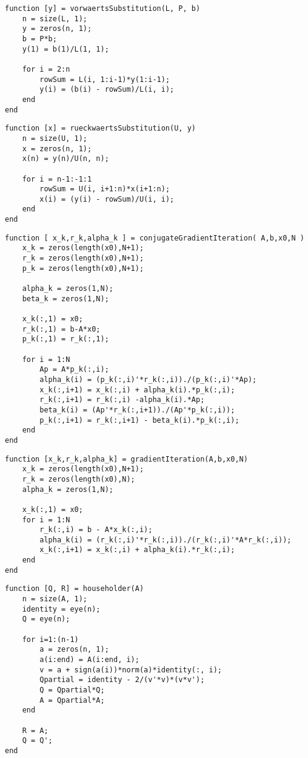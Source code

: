 \documentclass[german]{latex4ei/latex4ei_sheet}
\begin{document}
\begin{lstlisting}
function [y] = vorwaertsSubstitution(L, P, b)
    n = size(L, 1);
    y = zeros(n, 1);
    b = P*b;
    y(1) = b(1)/L(1, 1);

    for i = 2:n
        rowSum = L(i, 1:i-1)*y(1:i-1);
        y(i) = (b(i) - rowSum)/L(i, i);
    end
end
\end{lstlisting}

\begin{lstlisting}
function [x] = rueckwaertsSubstitution(U, y)
    n = size(U, 1);
    x = zeros(n, 1);
    x(n) = y(n)/U(n, n);

    for i = n-1:-1:1
        rowSum = U(i, i+1:n)*x(i+1:n);
        x(i) = (y(i) - rowSum)/U(i, i);
    end
end
\end{lstlisting}

\begin{lstlisting}
function [ x_k,r_k,alpha_k ] = conjugateGradientIteration( A,b,x0,N )
    x_k = zeros(length(x0),N+1);
    r_k = zeros(length(x0),N+1);
    p_k = zeros(length(x0),N+1);

    alpha_k = zeros(1,N);
    beta_k = zeros(1,N);

    x_k(:,1) = x0;
    r_k(:,1) = b-A*x0;
    p_k(:,1) = r_k(:,1);

    for i = 1:N
        Ap = A*p_k(:,i);
        alpha_k(i) = (p_k(:,i)'*r_k(:,i))./(p_k(:,i)'*Ap);
        x_k(:,i+1) = x_k(:,i) + alpha_k(i).*p_k(:,i);
        r_k(:,i+1) = r_k(:,i) -alpha_k(i).*Ap;
        beta_k(i) = (Ap'*r_k(:,i+1))./(Ap'*p_k(:,i));
        p_k(:,i+1) = r_k(:,i+1) - beta_k(i).*p_k(:,i);
    end
end
\end{lstlisting}

\begin{lstlisting}
function [x_k,r_k,alpha_k] = gradientIteration(A,b,x0,N)
    x_k = zeros(length(x0),N+1);
    r_k = zeros(length(x0),N);
    alpha_k = zeros(1,N);

    x_k(:,1) = x0;
    for i = 1:N
        r_k(:,i) = b - A*x_k(:,i);
        alpha_k(i) = (r_k(:,i)'*r_k(:,i))./(r_k(:,i)'*A*r_k(:,i));
        x_k(:,i+1) = x_k(:,i) + alpha_k(i).*r_k(:,i);
    end
end
\end{lstlisting}

\begin{lstlisting}
function [Q, R] = householder(A)
    n = size(A, 1);
    identity = eye(n);
    Q = eye(n);

    for i=1:(n-1)
        a = zeros(n, 1);
        a(i:end) = A(i:end, i);
        v = a + sign(a(i))*norm(a)*identity(:, i);
        Qpartial = identity - 2/(v'*v)*(v*v');
        Q = Qpartial*Q;
        A = Qpartial*A;
    end

    R = A;
    Q = Q';
end
\end{lstlisting}
\end{document}
